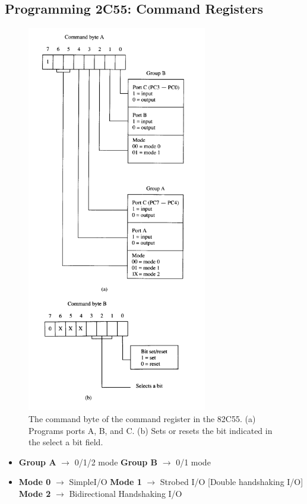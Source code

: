 \subsection{Programming 2C55: Command Registers}
\begin{figure}[h!]
  \includegraphics[width = 0.7\textwidth]{./figures/82C55.png}
  \caption{The command byte of the command register in the 82C55. (a) Programs ports A, B, and C. (b) Sets or resets the bit indicated in the select a bit field.}
\end{figure}
\begin{itemize}
  \item
  \textbf{Group A} $\longrightarrow $ 0/1/2 mode \newline
  \textbf{Group B} $\longrightarrow $ 0/1 mode \newline
  \item
  \textbf{Mode 0} $\longrightarrow $ SimpleI/O \newline
  \textbf{Mode 1} $\longrightarrow $ Strobed I/O [Double handshaking I/O] \newline
  \textbf{Mode 2} $\longrightarrow $ Bidirectional Handshaking I/O \newline

\end{itemize}
